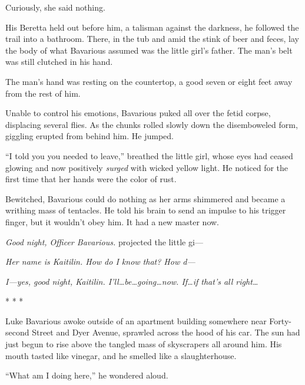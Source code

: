 Curiously, she said nothing.



His Beretta held out before him, a talisman against the darkness,
he followed the trail into a bathroom. There, in the tub and amid
the stink of beer and feces, lay the body of what Bavarious assumed
was the little girl's father. The man's belt was still clutched in
his hand.



The man's hand was resting on the countertop, a good seven or eight
feet away from the rest of him.



Unable to control his emotions, Bavarious puked all over the fetid
corpse, displacing several flies. As the chunks rolled slowly down
the disemboweled form, giggling erupted from behind him. He
jumped.



``I told you you needed to leave,'' breathed the little girl, whose
eyes had ceased glowing and now positively {\em surged} with
wicked yellow light. He noticed for the first time that her hands
were the color of rust.



Bewitched, Bavarious could do nothing as her arms shimmered and
became a writhing mass of tentacles. He told his brain to send an
impulse to his trigger finger, but it wouldn't obey him. It had a
new master now.



{\em Good night, Officer Bavarious.} projected the little
gi---



{\em Her name is Kaitilin. How do I know that? How d---}



{\em I---yes, good night, Kaitilin. I'll{\ldots}be{\ldots}going{\ldots}now.
If{\ldots}if that's all right{\ldots}}



* * *



Luke Bavarious awoke outside of an apartment building somewhere
near Forty-second Street and Dyer Avenue, sprawled across the hood
of his car. The sun had just begun to rise above the tangled mass
of skyscrapers all around him. His mouth tasted like vinegar, and
he smelled like a slaughterhouse.



``What am I doing here,'' he wondered aloud.



